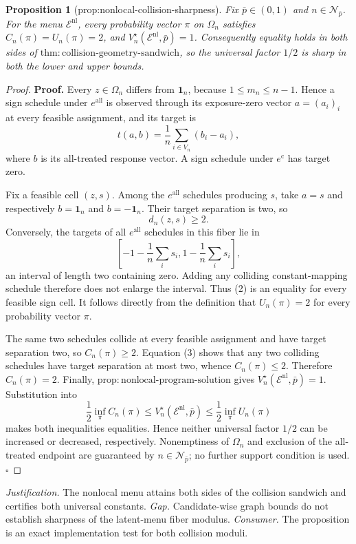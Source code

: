 \documentclass{article}
\newtheorem{proposition}{Proposition}
\begin{document}
\begin{proposition}[prop:nonlocal-collision-sharpness]\label{prop:nonlocal-collision-sharpness}
Fix \(\bar p\in(0,1)\) and \(n\in\mathcal N_{\bar p}\). For the menu \(\mathcal E^{\mathrm{nl}}\), every probability vector \(\pi\) on \(\Omega_n\) satisfies \(C_n(\pi)=U_n(\pi)=2\), and \(V_n^\star(\mathcal E^{\mathrm{nl}},\bar p)=1\). Consequently equality holds in both sides of \(\mathrm{thm{:}collision\text{-}geometry\text{-}sandwich}\), so the universal factor \(1/2\) is sharp in both the lower and upper bounds.
\end{proposition}
\begin{proof}
\textbf{Proof.}
Every \(z\in\Omega_n\) differs from \(\mathbf 1_n\), because \(1\le m_n\le n-1\). Hence a sign schedule under \(e^{\mathrm{all}}\) is observed through its exposure-zero vector \(a=(a_i)_i\) at every feasible assignment, and its target is
\[
 t(a,b)=\frac1n\sum_{i\in V_n}(b_i-a_i), \tag{1}
\]
where \(b\) is its all-treated response vector. A sign schedule under \(e^{\mathrm c}\) has target zero.

Fix a feasible cell \((z,s)\). Among the \(e^{\mathrm{all}}\) schedules producing \(s\), take \(a=s\) and respectively \(b=\mathbf 1_n\) and \(b=-\mathbf 1_n\). Their target separation is two, so
\[
 d_n(z,s)\ge2. \tag{2}
\]
Conversely, the targets of all \(e^{\mathrm{all}}\) schedules in this fiber lie in
\[
 \left[-1-\frac1n\sum_i s_i, 1-\frac1n\sum_i s_i\right], \tag{3}
\]
an interval of length two containing zero. Adding any colliding constant-mapping schedule therefore does not enlarge the interval. Thus (2) is an equality for every feasible sign cell. It follows directly from the definition that \(U_n(\pi)=2\) for every probability vector \(\pi\).

The same two schedules collide at every feasible assignment and have target separation two, so \(C_n(\pi)\ge2\). Equation (3) shows that any two colliding schedules have target separation at most two, whence \(C_n(\pi)\le2\). Therefore \(C_n(\pi)=2\). Finally, \(\mathrm{prop{:}nonlocal\text{-}program\text{-}solution}\) gives \(V_n^\star(\mathcal E^{\mathrm{nl}},\bar p)=1\). Substitution into
\[
 \frac12\inf_\pi C_n(\pi)
 \le V_n^\star(\mathcal E^{\mathrm{nl}},\bar p)
 \le\frac12\inf_\pi U_n(\pi)
\]
makes both inequalities equalities. Hence neither universal factor \(1/2\) can be increased or decreased, respectively. Nonemptiness of \(\Omega_n\) and exclusion of the all-treated endpoint are guaranteed by \(n\in\mathcal N_{\bar p}\); no further support condition is used. \(\square\)
\end{proof}
\par\smallskip\noindent \textit{Justification.} The nonlocal menu attains both sides of the collision sandwich and certifies both universal constants. \textit{Gap.} Candidate-wise graph bounds do not establish sharpness of the latent-menu fiber modulus. \textit{Consumer.} The proposition is an exact implementation test for both collision moduli.
\end{document}
